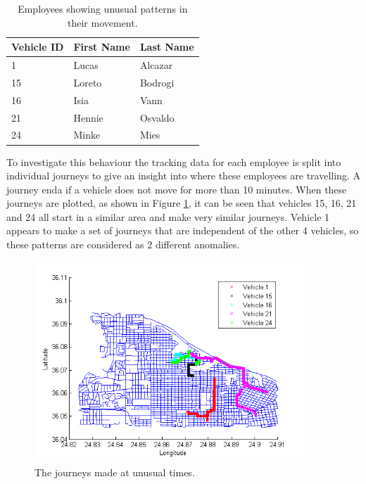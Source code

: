 \begin{table}[H]
\begin{center}
\begin{tabular}{|l|l|l|}
\hline
Vehicle ID & First Name & Last Name \\ \hline \hline

1 &Lucas & Alcazar\\ \hline
15&Loreto&Bodrogi\\ \hline
16&Isia& Vann\\ \hline
21&Hennie&Osvaldo \\ \hline
24&Minke& Mies

\end{tabular}
\caption{\label{table:time_ids}Employees showing unusual patterns in their movement.}
\end{center}
\end{table}

\noindent To investigate this behaviour the tracking data for each employee is split into individual journeys to give an insight into where these employees are travelling. A journey enda if a vehicle does not move for more than 10 minutes. When these journeys are plotted, as shown in Figure \ref{fig:TimeJourneys},  it can be seen that vehicles 15, 16, 21 and 24 all start in a similar area and make very similar journeys. Vehicle 1 appears to make a set of journeys that are independent of the other 4 vehicles, so these patterns are considered as 2 different anomalies. 

\begin{figure}[H]
\centering
\includegraphics[width=0.9\textwidth]{TimeJourneys.png}
\caption{\label{fig:TimeJourneys}The journeys made at unusual times.}
\end{figure}


